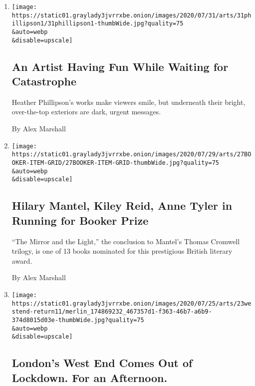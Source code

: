 \begin{enumerate}
\def\labelenumi{\arabic{enumi}.}
\item
  \href{/2020/07/31/arts/design/heather-phillipson-fourth-plinth.html}{}

  \texttt{[image: https://static01.graylady3jvrrxbe.onion/images/2020/07/31/arts/31phillipson1/31phillipson1-thumbWide.jpg?quality=75\\\&auto=webp\\\&disable=upscale]}

  \hypertarget{an-artist-having-fun-while-waiting-for-catastrophe}{%
  \subsection{An Artist Having Fun While Waiting for
  Catastrophe}\label{an-artist-having-fun-while-waiting-for-catastrophe}}

  Heather Phillipson's works make viewers smile, but underneath their
  bright, over-the-top exteriors are dark, urgent messages.

  By Alex Marshall
\item
  \href{/2020/07/27/books/hilary-mantel-booker-prize-longlist.html}{}

  \texttt{[image: https://static01.graylady3jvrrxbe.onion/images/2020/07/29/arts/27BOOKER-ITEM-GRID/27BOOKER-ITEM-GRID-thumbWide.jpg?quality=75\\\&auto=webp\\\&disable=upscale]}

  \hypertarget{hilary-mantel-kiley-reid-anne-tyler-in-running-for-booker-prize}{%
  \subsection{Hilary Mantel, Kiley Reid, Anne Tyler in Running for
  Booker
  Prize}\label{hilary-mantel-kiley-reid-anne-tyler-in-running-for-booker-prize}}

  ``The Mirror and the Light,'' the conclusion to Mantel's Thomas
  Cromwell trilogy, is one of 13 books nominated for this prestigious
  British literary award.

  By Alex Marshall
\item
  \href{/2020/07/23/theater/west-end-london-virus.html}{}

  \texttt{[image: https://static01.graylady3jvrrxbe.onion/images/2020/07/25/arts/23westend-return11/merlin\_174869232\_467357d1-f363-46b7-a6b9-374d8015d03e-thumbWide.jpg?quality=75\\\&auto=webp\\\&disable=upscale]}

  \hypertarget{londons-west-end-comes-out-of-lockdown-for-an-afternoon}{%
  \subsection{London's West End Comes Out of Lockdown. For an
  Afternoon.}\label{londons-west-end-comes-out-of-lockdown-for-an-afternoon}}


\end{enumerate}
